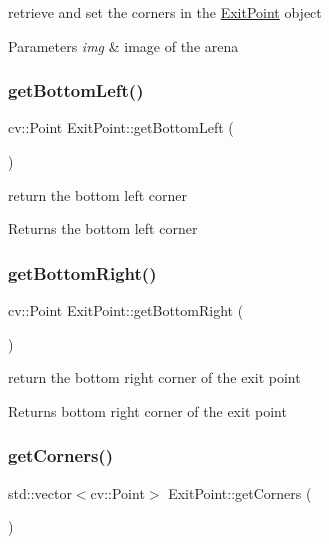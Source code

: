 retrieve and set the corners in the \mbox{\hyperlink{class_exit_point}{Exit\+Point}} object 
\begin{DoxyParams}{Parameters}
{\em img} & image of the arena \\
\hline
\end{DoxyParams}
\mbox{\label{class_exit_point_a51ac01267f39908e468ec859ba8d3096}} 
\subsubsection{\texorpdfstring{get\+Bottom\+Left()}{getBottomLeft()}}
{\footnotesize\ttfamily cv\+::\+Point Exit\+Point\+::get\+Bottom\+Left (\begin{DoxyParamCaption}{ }\end{DoxyParamCaption})}

return the bottom left corner \begin{DoxyReturn}{Returns}
the bottom left corner 
\end{DoxyReturn}
\mbox{\label{class_exit_point_a7a0e9d613aa361083bd4bf91f2080398}} 
\subsubsection{\texorpdfstring{get\+Bottom\+Right()}{getBottomRight()}}
{\footnotesize\ttfamily cv\+::\+Point Exit\+Point\+::get\+Bottom\+Right (\begin{DoxyParamCaption}{ }\end{DoxyParamCaption})}

return the bottom right corner of the exit point \begin{DoxyReturn}{Returns}
bottom right corner of the exit point 
\end{DoxyReturn}
\mbox{\label{class_exit_point_ac26a595a35b370cf7375874395715af0}} 
\subsubsection{\texorpdfstring{get\+Corners()}{getCorners()}}
{\footnotesize\ttfamily std\+::vector$<$cv\+::\+Point$>$ Exit\+Point\+::get\+Corners (\begin{DoxyParamCaption}{ }\end{DoxyParamCaption})}

